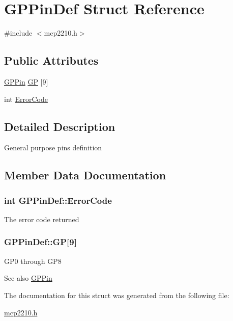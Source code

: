 \hypertarget{struct_g_p_pin_def}{\section{\-G\-P\-Pin\-Def \-Struct \-Reference}
\label{struct_g_p_pin_def}
}


{\ttfamily \#include $<$mcp2210.\-h$>$}

\subsection*{\-Public \-Attributes}
\begin{DoxyCompactItemize}
\item 
\hyperlink{struct_g_p_pin}{\-G\-P\-Pin} \hyperlink{struct_g_p_pin_def_a5274d0e49d1ec54865a419b2ef722d32}{\-G\-P} \mbox{[}9\mbox{]}
\item 
int \hyperlink{struct_g_p_pin_def_aec1b783e71959f2715543127bf6ed164}{\-Error\-Code}
\end{DoxyCompactItemize}


\subsection{\-Detailed \-Description}
\-General purpose pins definition 

\subsection{\-Member \-Data \-Documentation}
\hypertarget{struct_g_p_pin_def_aec1b783e71959f2715543127bf6ed164}{
\subsubsection[{\-Error\-Code}]{\setlength{\rightskip}{0pt plus 5cm}int {\bf \-G\-P\-Pin\-Def\-::\-Error\-Code}}}\label{struct_g_p_pin_def_aec1b783e71959f2715543127bf6ed164}
\-The error code returned \hypertarget{struct_g_p_pin_def_a5274d0e49d1ec54865a419b2ef722d32}{
\subsubsection[{\-G\-P}]{ {\bf \-G\-P\-Pin\-Def\-::\-G\-P}\mbox{[}9\mbox{]}}}\label{struct_g_p_pin_def_a5274d0e49d1ec54865a419b2ef722d32}
\-G\-P0 through \-G\-P8 \begin{DoxySeeAlso}{\-See also}
\hyperlink{struct_g_p_pin}{\-G\-P\-Pin} 
\end{DoxySeeAlso}


\-The documentation for this struct was generated from the following file\-:\begin{DoxyCompactItemize}
\item 
\hyperlink{mcp2210_8h}{mcp2210.\-h}\end{DoxyCompactItemize}
